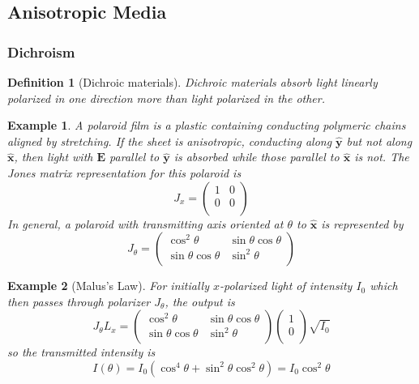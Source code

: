 \documentclass[a4paper]{article}
\newtheorem{eg}{Example}[section]
\theoremstyle{new}
\newtheorem{defi}{Definition}[section]
\begin{document}
\subsection{Anisotropic Media}
\subsubsection{Dichroism}
\begin{defi}[Dichroic materials]
Dichroic materials absorb light linearly polarized in one direction more than light polarized in the other.
\end{defi}
\begin{eg}
A polaroid film is a plastic containing conducting polymeric chains aligned by stretching. If the sheet is anisotropic, conducting along $\mathbf{\hat{y}}$ but not along $\mathbf{\hat{x}}$, then light with $\mathbf{E}$ parallel to $\mathbf{\hat{y}}$ is absorbed while those parallel to $\mathbf{\hat{x}}$ is not. The Jones matrix representation for this polaroid is
$$J_x=\begin{pmatrix}1&0\\0&0\\\end{pmatrix}$$
In general, a polaroid with transmitting axis oriented at $\theta$ to $\mathbf{\hat{x}}$ is represented by
$$J_\theta=\begin{pmatrix}\cos^2\theta&\sin\theta\cos\theta\\\sin\theta\cos\theta&\sin^2\theta\\\end{pmatrix}$$
\end{eg}
\begin{eg}[Malus's Law]
For initially $x$-polarized light of intensity $I_0$ which then passes through polarizer $J_\theta$, the output is
$$J_\theta L_x=\begin{pmatrix}\cos^2\theta&\sin\theta\cos\theta\\\sin\theta\cos\theta&\sin^2\theta\\\end{pmatrix}\begin{pmatrix}1\\0\\\end{pmatrix}\sqrt{I_0}$$
so the transmitted intensity is
$$I(\theta)=I_0(\cos^4\theta+\sin^2\theta\cos^2\theta)=I_0\cos^2\theta$$
\end{eg}
\end{document}
